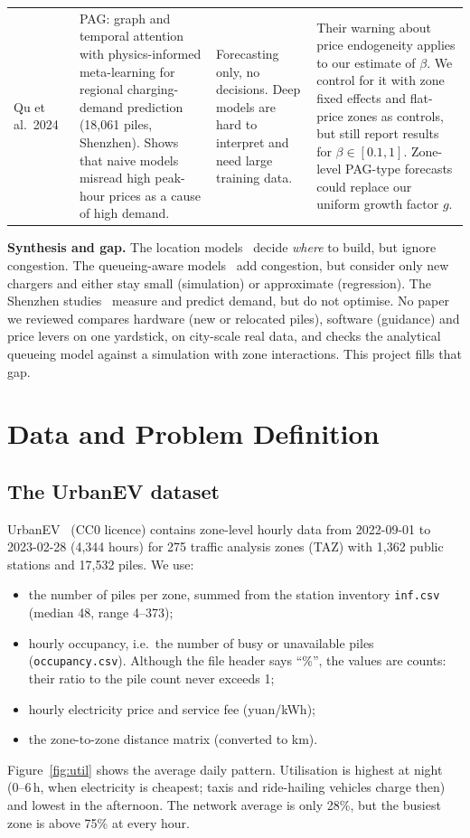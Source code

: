 \documentclass[11pt,a4paper]{article}
\begin{document}
{\begin{longtable}{@{}L{1.9cm}L{4.4cm}L{3.9cm}L{4.9cm}@{}}
Qu et al.\ 2024~\cite{qu2024} & PAG: graph and temporal attention with physics-informed meta-learning for regional charging-demand prediction (18{,}061 piles, Shenzhen). Shows that naive models misread high peak-hour prices as a cause of high demand. & Forecasting only, no decisions. Deep models are hard to interpret and need large training data. & Their warning about price endogeneity applies to our estimate of $\beta$. We control for it with zone fixed effects and flat-price zones as controls, but still report results for $\beta \in [0.1, 1]$. Zone-level PAG-type forecasts could replace our uniform growth factor $g$.\\
\end{longtable}}

\textbf{Synthesis and gap.} The location models~\cite{hodgson1990,kuby2005,he2013} decide \emph{where} to build, but ignore congestion. The queueing-aware models~\cite{jung2014,yang2017} add congestion, but consider only new chargers and either stay small (simulation) or approximate (regression). The Shenzhen studies~\cite{li2025urbanev,kuang2024,qu2024} measure and predict demand, but do not optimise. No paper we reviewed compares hardware (new or relocated piles), software (guidance) and price levers on one yardstick, on city-scale real data, and checks the analytical queueing model against a simulation with zone interactions. This project fills that gap.

\section{Data and Problem Definition}\label{sec:data}
\subsection{The UrbanEV dataset}
UrbanEV~\cite{li2025urbanev} (CC0 licence) contains zone-level hourly data from 2022-09-01 to 2023-02-28 (4{,}344 hours) for 275 traffic analysis zones (TAZ) with 1{,}362 public stations and 17{,}532 piles. We use:
\begin{itemize}[leftmargin=1.3em,itemsep=1pt]
\item the number of piles per zone, summed from the station inventory \texttt{inf.csv} (median 48, range 4--373);
\item hourly occupancy, i.e.\ the number of busy or unavailable piles (\texttt{occupancy.csv}). Although the file header says ``\%'', the values are counts: their ratio to the pile count never exceeds 1;
\item hourly electricity price and service fee (yuan/kWh);
\item the zone-to-zone distance matrix (converted to km).
\end{itemize}
Figure~\ref{fig:util} shows the average daily pattern. Utilisation is highest at night (0--6\,h, when electricity is cheapest; taxis and ride-hailing vehicles charge then) and lowest in the afternoon. The network average is only 28\%, but the busiest zone is above 75\% at every hour.
\end{document}
